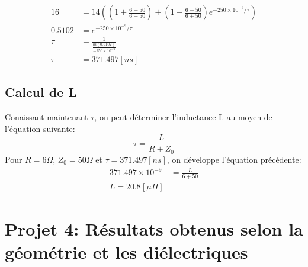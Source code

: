 \begin{align*}
16 &= 14 \left( \left(1 + \frac{6 - 50}{6 + 50}\right) + \left(1 -\frac{6 - 50}{6 + 50}\right) e^{-250 \times 10^{-9}/\tau} \right)\\
0.5102 &= e^{-250 \times 10^{-9}/\tau}\\
\tau   &= \frac{1}{\frac{ln(0.5102)}{-250 \times 10^{-9}}}\\
\tau   &= 371.497\left[ns\right]
\end{align*}

\subsection*{Calcul de L}

Conaissant maintenant $\tau$, on peut déterminer l'inductance L au moyen de l'équation suivante:
\begin{equation}
\tau = \frac{L}{R + Z_0}
\end{equation}
Pour $R = 6 \Omega$, $Z_0 = 50 \Omega$ et $\tau = 371.497\left[ns\right]$, on développe l'équation précédente:
\begin{align*}
371.497\times 10^{-9} &= \frac{L}{6 + 50}\\
L = 20.8 \left[\mu H\right]
\end{align*}
\newpage
\section{Projet 4: Résultats obtenus selon la géométrie et les diélectriques}


